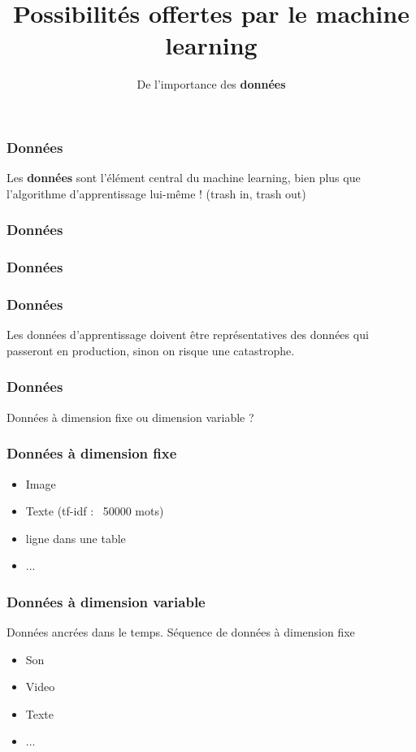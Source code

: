 \documentclass{formation}
\title{Possibilités offertes par le machine learning}
\subtitle{De l'importance des \textbf{données}}
\begin{document}
\maketitle

\begin{frame}
  \frametitle{Données}
  Les \textbf{données} sont l'élément central du machine learning, bien plus que l'algorithme d'apprentissage lui-même !
  (trash in, trash out)
\end{frame}

\begin{frame}
  \frametitle{Données}
\end{frame}

\begin{frame}
  \frametitle{Données}
\end{frame}

\begin{frame}
  \frametitle{Données}
  Les données d'apprentissage doivent être représentatives des données qui passeront en production, sinon on risque une catastrophe.
\end{frame}

\begin{frame}
  \frametitle{Données}
  Données à dimension fixe ou dimension variable ?
\end{frame}

\begin{frame}
  \frametitle{Données à dimension fixe}
  \begin{itemize}
  \item Image
  \item Texte (tf-idf : ~50000 mots)
  \item ligne dans une table
  \item ...
  \end{itemize}
\end{frame}

\begin{frame}
  \frametitle{Données à dimension variable}
  Données ancrées dans le temps.
  \newline
  Séquence de données à dimension fixe
  \begin{itemize}
  \item Son
  \item Video
  \item Texte
  \item ...
  \end{itemize}
\end{frame}
\end{document}
